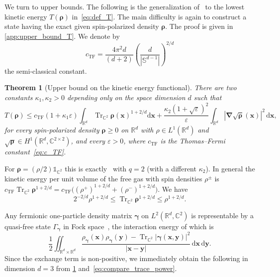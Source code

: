 \documentclass[final,reqno]{amsart}
\newtheorem{theorem}{Theorem}[section]
\theoremstyle{remark}
\renewcommand{\le}{\leqslant}
\renewcommand{\ge}{\geqslant}
\renewcommand{\epsilon}{\varepsilon}
\DeclareMathOperator{\Tr}{Tr}
\newcommand{\Trs}{\Tr_{\CC^2}}
\newcommand{\RR}{\mathbb{R}}
\newcommand{\CC}{\mathbb{C}}
\newcommand{\TF}{\mathrm{TF}}
\newcommand{\iden}{\mathbb{1}}
\newcommand{\grad}{\bm{\nabla}}
\newcommand{\dd}{\mathrm{d}}
\begin{document}
We turn to upper bounds. The following is the generalization of~\cite[Theorem~8]{lewin2020local} to the lowest kinetic energy $T(\bm{\rho})$ in~\cref{eq:def_T}. The main difficulty is again to construct a state having the exact given spin-polarized density $\bm{\rho}$. The proof is given in \cref{app:upper_bound_T}. We denote by
\begin{equation}\label{eq:c_TF}
c_\TF=\frac{ 4\pi^2 d}{(d+2)} \left( \dfrac{d}{| \mathbb{S}^{d-1} |} \right)^{2/d}
\end{equation}
the semi-classical constant.

\begin{theorem}[Upper bound on the kinetic energy functional]\label{thm:upper_bound_T}
There are two constants $\kappa_1,\kappa_2>0$ depending only on the space dimension $d$ such that
\begin{equation}\label{eq:upper_bound_T_kappa}
 T(\bm{\rho})\le c_\TF\left(1+\kappa_1\epsilon\right)\int_{\RR^d}\Trs \bm{\rho}(\mathbf{x})^{1+2/d}\dd \mathbf{x}
 +\frac{\kappa_2(1+\sqrt\epsilon)^2}{\epsilon}\int_{\RR^d}|\grad\sqrt{\bm{\rho}}(\mathbf{x})|^2\,\dd \mathbf{x},
\end{equation}
for every spin-polarized density $\bm{\rho}\ge0$ on $\RR^d$ with $\rho\in L^1(\RR^d)$ and $\sqrt{\bm{\rho}}\in H^1(\RR^d,\CC^{2\times2})$, and every $\epsilon>0$, where $c_\TF$ is the Thomas--Fermi constant~\cref{eq:c_TF}.
\end{theorem}

For $\bm{\rho}=(\rho/2)\iden_{\CC^2}$ this is exactly~\cite[Theorem~8]{lewin2020local} with $q=2$ (with a different $\kappa_2$). In general the kinetic energy per unit volume of the free gas with spin densities $\rho^\pm$ is $c_\TF\Trs \bm{\rho}^{1+2/d}=c_\TF\big((\rho^+)^{1+2/d}+(\rho^-)^{1+2/d}\big)$. We have
\begin{equation}\label{eq:compare_trace_power}
2^{-2/d}\rho^{1+2/d}\le \Trs \bm{\rho}^{1+2/d}\le \rho^{1+2/d}.
\end{equation}

Any fermionic one-particle density matrix $\bm{\gamma}$ on $L^2(\RR^d,\CC^2)$ is representable by a quasi-free state $\Gamma_{\bm{\gamma}}$ in Fock space~\cite{bach1994generalized}, the interaction energy of which is
$$
\frac12 \iint_{\RR^d\times\RR^d}\frac{\rho_{\bm{\gamma}}(\mathbf{x})\rho_{\bm{\gamma}}(\mathbf{y})-\Trs|\bm{\gamma}(\mathbf{x},\mathbf{y})|^2}{|\mathbf{x}-\mathbf{y}|}\,\dd\mathbf{x}\,\dd\mathbf{y}.
$$
Since the exchange term is non-positive, we immediately obtain the following in dimension $d=3$ from \cref{thm:upper_bound_T} and~\cref{eq:compare_trace_power}.
\end{document}
